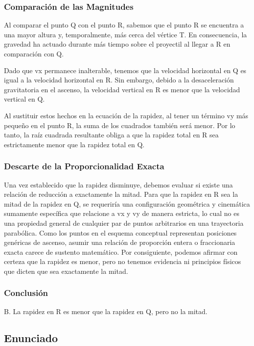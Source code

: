 \documentclass[12pt, a4paper]{article}
\begin{document}
\subsubsection*{Comparación de las Magnitudes}

Al comparar el punto Q con el punto R, sabemos que el punto R se encuentra a una mayor altura y, temporalmente, más cerca del vértice T. En consecuencia, la gravedad ha actuado durante más tiempo sobre el proyectil al llegar a R en comparación con Q. 

Dado que vx permanece inalterable, tenemos que la velocidad horizontal en Q es igual a la velocidad horizontal en R. Sin embargo, debido a la desaceleración gravitatoria en el ascenso, la velocidad vertical en R es menor que la velocidad vertical en Q.

Al sustituir estos hechos en la ecuación de la rapidez, al tener un término vy más pequeño en el punto R, la suma de los cuadrados también será menor. Por lo tanto, la raíz cuadrada resultante obliga a que la rapidez total en R sea estrictamente menor que la rapidez total en Q.

\subsubsection*{Descarte de la Proporcionalidad Exacta}

Una vez establecido que la rapidez disminuye, debemos evaluar si existe una relación de reducción a exactamente la mitad. Para que la rapidez en R sea la mitad de la rapidez en Q, se requeriría una configuración geométrica y cinemática sumamente específica que relacione a vx y vy de manera estricta, lo cual no es una propiedad general de cualquier par de puntos arbitrarios en una trayectoria parabólica. Como los puntos en el esquema conceptual representan posiciones genéricas de ascenso, asumir una relación de proporción entera o fraccionaria exacta carece de sustento matemático. Por consiguiente, podemos afirmar con certeza que la rapidez es menor, pero no tenemos evidencia ni principios físicos que dicten que sea exactamente la mitad.

\subsubsection*{Conclusión}

B. La rapidez en R es menor que la rapidez en Q, pero no la mitad.

\newpage

\subsection*{Enunciado}
\end{document}
